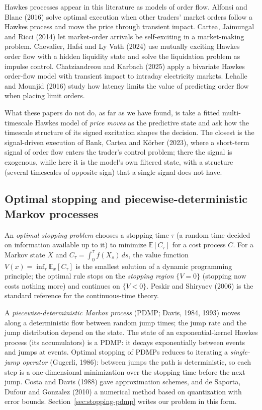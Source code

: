 \documentclass[11pt]{article}
\theoremstyle{definition}
\theoremstyle{remark}
\newcommand{\E}{\mathbb{E}}
\begin{document}
Hawkes processes appear in this literature as models of order flow. Alfonsi and Blanc (2016) solve optimal execution when other traders' market orders follow a Hawkes process and move the price through transient impact. Cartea, Jaimungal and Ricci (2014) let market-order arrivals be self-exciting in a market-making problem. Chevalier, Hafsi and Ly Vath (2024) use mutually exciting Hawkes order flow with a hidden liquidity state and solve the liquidation problem as impulse control. Chatziandreou and Karbach (2025) apply a bivariate Hawkes order-flow model with transient impact to intraday electricity markets. Lehalle and Mounjid (2016) study how latency limits the value of predicting order flow when placing limit orders.

What these papers do not do, as far as we have found, is take a fitted multi-timescale Hawkes model of \emph{price moves} as the predictive state and ask how the timescale structure of its signed excitation shapes the decision. The closest is the signal-driven execution of Bank, Cartea and K\"orber (2023), where a short-term signal of order flow enters the trader's control problem; there the signal is exogenous, while here it is the model's own filtered state, with a structure (several timescales of opposite sign) that a single signal does not have.

\subsection{Optimal stopping and piecewise-deterministic Markov processes}
\label{sec:bg-stopping}

An \emph{optimal stopping problem} chooses a stopping time $\tau$ (a random time decided on information available up to it) to minimize $\E[C_\tau]$ for a cost process $C$. For a Markov state $X$ and $C_\tau = \int_0^\tau f(X_s)\,ds$, the value function $V(x) = \inf_\tau \E_x[C_\tau]$ is the smallest solution of a dynamic programming principle; the optimal rule stops on the \emph{stopping region} $\{V = 0\}$ (stopping now costs nothing more) and continues on $\{V < 0\}$. Peskir and Shiryaev (2006) is the standard reference for the continuous-time theory.

A \emph{piecewise-deterministic Markov process} (PDMP; Davis, 1984, 1993) moves along a deterministic flow between random jump times; the jump rate and the jump distribution depend on the state. The state of an exponential-kernel Hawkes process (its accumulators) is a PDMP: it decays exponentially between events and jumps at events. Optimal stopping of PDMPs reduces to iterating a \emph{single-jump operator} (Gugerli, 1986): between jumps the path is deterministic, so each step is a one-dimensional minimization over the stopping time before the next jump. Costa and Davis (1988) gave approximation schemes, and de Saporta, Dufour and Gonzalez (2010) a numerical method based on quantization with error bounds. Section~\ref{sec:stopping-pdmp} writes our problem in this form.
\end{document}
